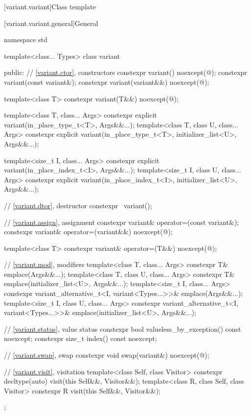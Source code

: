 [variant.variant]{Class template }%
%

[variant.variant.general]{General}

\begin{codeblock}
namespace std {
  template<class... Types>
  class variant {
  public:
    // \ref{variant.ctor}, constructors
    constexpr variant() noexcept(@\seebelow@);
    constexpr variant(const variant&);
    constexpr variant(variant&&) noexcept(@\seebelow@);

    template<class T>
      constexpr variant(T&&) noexcept(@\seebelow@);

    template<class T, class... Args>
      constexpr explicit variant(in_place_type_t<T>, Args&&...);
    template<class T, class U, class... Args>
      constexpr explicit variant(in_place_type_t<T>, initializer_list<U>, Args&&...);

    template<size_t I, class... Args>
      constexpr explicit variant(in_place_index_t<I>, Args&&...);
    template<size_t I, class U, class... Args>
      constexpr explicit variant(in_place_index_t<I>, initializer_list<U>, Args&&...);

    // \ref{variant.dtor}, destructor
    constexpr ~variant();

    // \ref{variant.assign}, assignment
    constexpr variant& operator=(const variant&);
    constexpr variant& operator=(variant&&) noexcept(@\seebelow@);

    template<class T> constexpr variant& operator=(T&&) noexcept(@\seebelow@);

    // \ref{variant.mod}, modifiers
    template<class T, class... Args>
      constexpr T& emplace(Args&&...);
    template<class T, class U, class... Args>
      constexpr T& emplace(initializer_list<U>, Args&&...);
    template<size_t I, class... Args>
      constexpr variant_alternative_t<I, variant<Types...>>& emplace(Args&&...);
    template<size_t I, class U, class... Args>
      constexpr variant_alternative_t<I, variant<Types...>>&
        emplace(initializer_list<U>, Args&&...);

    // \ref{variant.status}, value status
    constexpr bool valueless_by_exception() const noexcept;
    constexpr size_t index() const noexcept;

    // \ref{variant.swap}, swap
    constexpr void swap(variant&) noexcept(@\seebelow@);

    // \ref{variant.visit}, visitation
    template<class Self, class Visitor>
      constexpr decltype(auto) visit(this Self&&, Visitor&&);
    template<class R, class Self, class Visitor>
      constexpr R visit(this Self&&, Visitor&&);
  };
}
\end{codeblock}


